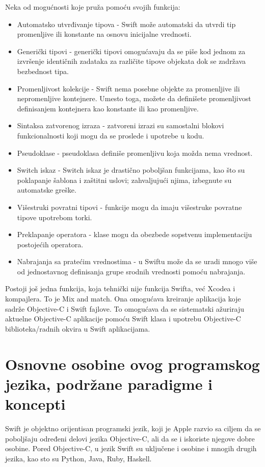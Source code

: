 \documentclass[a4paper]{article}
\begin{document}
Neka od mogućnosti koje pruža pomoću svojih funkcija:
\begin{itemize}
\item Automatsko utvrđivanje tipova - Swift može automatski da utvrdi tip promenljive ili konstante na osnovu inicijalne
vrednosti. 
\item Generički tipovi - generički tipovi omogućavaju da se piše kod jednom za izvršenje identičnih
zadataka za različite tipove objekata dok se zadržava bezbednost tipa. 
\item Promenljivost kolekcije - Swift nema posebne objekte za promenljive ili nepromenljive kontejnere. Umesto
toga, možete da definišete promenljivost definisanjem kontejnera kao konstante
ili kao promenljive.
\item Sintaksa zatvorenog izraza - zatvoreni izrazi su samostalni blokovi funkcionalnosti koji mogu da se proslede i upotrebe u kodu.
\item Pseudoklase - pseudoklasa definiše promenljivu koja možda nema vrednost.
\item Switch iskaz - Switch iskaz je drastično poboljšan funkcijama, kao što su poklapanje šablona i
zaštitni uslovi; zahvaljujući njima, izbegnute su automatske greške.
\item Višestruki povratni tipovi - funkcije mogu da imaju višestruke povratne tipove upotrebom torki. 
\item Preklapanje operatora - klase mogu da obezbede sopstvenu implementaciju postojećih operatora. 
\item Nabrajanja sa pratećim vrednostima - u Swiftu može da se uradi mnogo više od jednostavnog definisanja grupe srodnih vrednosti pomoću nabrajanja.
\end{itemize}

Postoji još jedna funkcija, koja tehnički nije
funkcija Swifta, već Xcodea i kompajlera. To je Mix and match. Ona omogućava kreiranje aplikacija koje sadrže Objective-C i Swift fajlove. To omogućava da se sistematski ažuriraju aktuelne Objective-C aplikacije pomoću Swift klasa i upotrebu Objective-C biblioteka/radnih okvira u Swift aplikacijama.


\section{Osnovne osobine ovog programskog jezika, podržane paradigme i koncepti}	
\label{sec:treciDeo}

Swift je objektno orijentisan programski jezik, koji je Apple razvio sa ciljem da 
se poboljšaju određeni delovi jezika Objective-C, ali da se i iskoriste njegove
dobre osobine. Pored Objective-C, u jezik Swift su uključene i osobine i mnogih drugih jezika,
kao sto su Python, Java, Ruby, Haskell.
\end{document}
